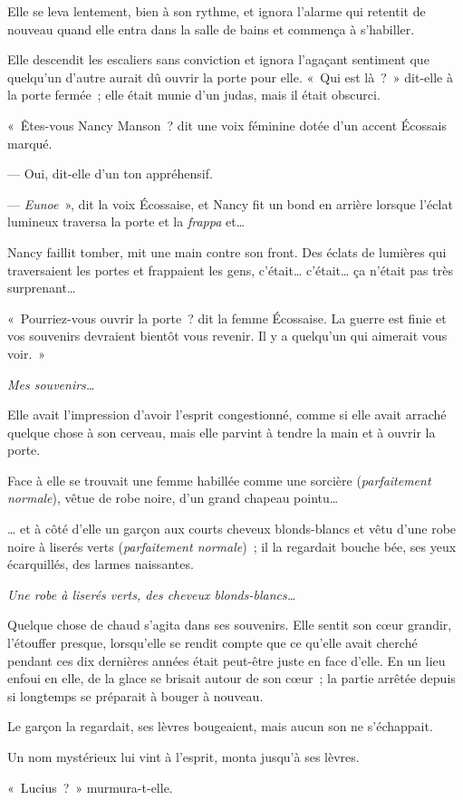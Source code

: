 Elle se leva lentement, bien à son rythme, et ignora l'alarme qui retentit de nouveau quand elle entra dans la salle de bains et commença à s'habiller.

Elle descendit les escaliers sans conviction et ignora l'agaçant sentiment que quelqu'un d'autre aurait dû ouvrir la porte pour elle.
«~Qui est là~?~»
dit-elle à la porte fermée~; elle était munie d'un judas, mais il était obscurci.

«~Êtes-vous Nancy Manson~? dit une voix féminine dotée d'un accent Écossais marqué.

--- Oui, dit-elle d'un ton appréhensif.

--- \emph{Eunoe}~», dit la voix Écossaise, et Nancy fit un bond en arrière lorsque l'éclat lumineux traversa la porte et la \emph{frappa} et…

Nancy faillit tomber, mit une main contre son front.
Des éclats de lumières qui traversaient les portes et frappaient les gens, c'était… c'était… ça n'était pas très surprenant…

«~Pourriez-vous ouvrir la porte~? dit la femme Écossaise.
La guerre est finie et vos souvenirs devraient bientôt vous revenir.
Il y a quelqu'un qui aimerait vous voir.~»

\emph{Mes souvenirs…}

Elle avait l'impression d'avoir l'esprit congestionné, comme si elle avait arraché quelque chose à son cerveau, mais elle parvint à tendre la main et à ouvrir la porte.

Face à elle se trouvait une femme habillée comme une sorcière (\emph{parfaitement normale}), vêtue de robe noire, d'un grand chapeau pointu…

… et à côté d'elle un garçon aux courts cheveux blonds-blancs et vêtu d'une robe noire à liserés verts (\emph{parfaitement normale})~; il la regardait bouche bée, ses yeux écarquillés, des larmes naissantes.

\emph{Une robe à liserés verts, des cheveux blonds-blancs…}

Quelque chose de chaud s'agita dans ses souvenirs.
Elle sentit son cœur grandir, l'étouffer presque, lorsqu'elle se rendit compte que ce qu'elle avait cherché pendant ces dix dernières années était peut-être juste en face d'elle.
En un lieu enfoui en elle, de la glace se brisait autour de son cœur~; la partie arrêtée depuis si longtemps se préparait à bouger à nouveau.

Le garçon la regardait, ses lèvres bougeaient, mais aucun son ne s'échappait.

Un nom mystérieux lui vint à l'esprit, monta jusqu'à ses lèvres.

«~Lucius~?~»
murmura-t-elle.

